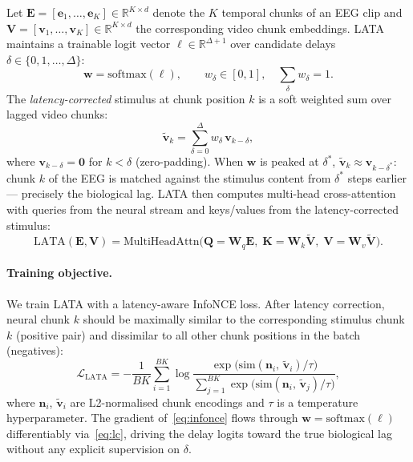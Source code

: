 \documentclass[11pt]{article}
\begin{document}
Let $\mathbf{E} = [\mathbf{e}_1, \ldots, \mathbf{e}_K] \in \mathbb{R}^{K
\times d}$ denote the $K$ temporal chunks of an EEG clip and
$\mathbf{V} = [\mathbf{v}_1, \ldots, \mathbf{v}_K] \in \mathbb{R}^{K \times
d}$ the corresponding video chunk embeddings.
LATA maintains a trainable logit vector
$\boldsymbol{\ell} \in \mathbb{R}^{\Delta+1}$ over candidate delays
$\delta \in \{0, 1, \ldots, \Delta\}$:
%
\begin{equation}
    \mathbf{w} = \mathrm{softmax}(\boldsymbol{\ell}),
    \qquad w_\delta \in [0,1],
    \quad \textstyle\sum_\delta w_\delta = 1.
    \label{eq:softmax}
\end{equation}
%
The \emph{latency-corrected} stimulus at chunk position $k$ is a soft
weighted sum over lagged video chunks:
%
\begin{equation}
    \tilde{\mathbf{v}}_k
    = \sum_{\delta=0}^{\Delta} w_\delta\, \mathbf{v}_{k-\delta},
    \label{eq:lc}
\end{equation}
%
where $\mathbf{v}_{k-\delta} = \mathbf{0}$ for $k < \delta$ (zero-padding).
When $\mathbf{w}$ is peaked at $\delta^*$,
$\tilde{\mathbf{v}}_k \approx \mathbf{v}_{k-\delta^*}$:
chunk $k$ of the EEG is matched against the stimulus content from
$\delta^*$ steps earlier — precisely the biological lag.
LATA then computes multi-head cross-attention with queries from the neural
stream and keys/values from the latency-corrected stimulus:
%
\begin{equation}
    \mathrm{LATA}(\mathbf{E}, \mathbf{V})
    = \mathrm{MultiHeadAttn}\!\bigl(
        \mathbf{Q}{=}\mathbf{W}_q\mathbf{E},\;
        \mathbf{K}{=}\mathbf{W}_k\tilde{\mathbf{V}},\;
        \mathbf{V}{=}\mathbf{W}_v\tilde{\mathbf{V}}
      \bigr).
    \label{eq:lata}
\end{equation}

\paragraph{Training objective.}
We train LATA with a latency-aware InfoNCE loss.
After latency correction, neural chunk $k$ should be maximally similar to
the corresponding stimulus chunk $k$ (positive pair) and dissimilar to all
other chunk positions in the batch (negatives):
%
\begin{equation}
    \mathcal{L}_{\mathrm{LATA}}
    = -\frac{1}{BK}\sum_{i=1}^{BK}
      \log \frac{
        \exp\!\bigl(\mathrm{sim}(\mathbf{n}_i,\,\tilde{\mathbf{v}}_i)/\tau\bigr)
      }{
        \sum_{j=1}^{BK}
        \exp\!\bigl(\mathrm{sim}(\mathbf{n}_i,\,\tilde{\mathbf{v}}_j)/\tau\bigr)
      },
    \label{eq:infonce}
\end{equation}
%
where $\mathbf{n}_i$, $\tilde{\mathbf{v}}_i$ are L2-normalised chunk
encodings and $\tau$ is a temperature hyperparameter.
The gradient of~\eqref{eq:infonce} flows through
$\mathbf{w} = \mathrm{softmax}(\boldsymbol{\ell})$
differentiably via~\eqref{eq:lc}, driving the delay logits toward the
true biological lag without any explicit supervision on $\delta$.
\end{document}
